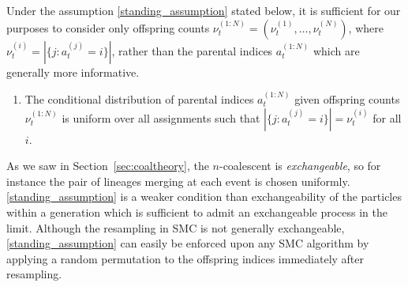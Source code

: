 Under the assumption \ref{standing_assumption} stated below, it is sufficient for our purposes to consider only offspring counts $\nu_t^{(1:N)} = (\nu_t^{(1)},\dots,\nu_t^{(N)})$, where $\nu_t^{(i)} = |\{ j: a_t^{(j)} =i \}|$, rather than the parental indices $a_t^{(1:N)}$ which are generally more informative.
\begin{enumerate}[label=(A\arabic*)]
\item\label{standing_assumption} The conditional distribution of parental indices $a_t^{(1:N)}$ given offspring counts $\nu_t^{(1:N)}$ is uniform over all assignments such that $ |\{ j: a_t^{(j)} =i \}|= \nu_t^{(i)} $ for all $i$.
\end{enumerate}
As we saw in Section~\ref{sec:coaltheory}, the $n$-coalescent is \emph{exchangeable}, so for instance the pair of lineages merging at each event is chosen uniformly. 
\ref{standing_assumption} is a weaker condition than exchangeability of the particles within a generation which is sufficient to admit an exchangeable process in the limit.
Although the resampling in SMC is not generally exchangeable, %
\ref{standing_assumption} can easily be enforced upon any SMC algorithm by applying a random permutation to the offspring indices immediately after resampling.




